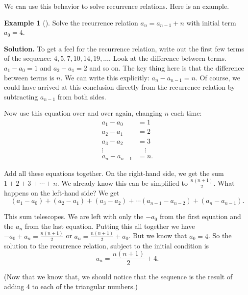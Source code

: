 \documentclass[12pt,]{book}
\theoremstyle{plain}
\theoremstyle{definition}
\theoremstyle{definition}
\newtheorem{example}[theorem]{Example}
\theoremstyle{definition}
\numberwithin{equation}{chapter}
\newcommand{\amp}{&}
\begin{document}
We can use this behavior to solve recurrence relations. Here is an example.%
\begin{example}[]\label{example-20}
\hypertarget{p-298}{}%
Solve the recurrence relation \(a_n = a_{n-1} + n\) with initial term \(a_0 = 4\).%
\par\smallskip%
\noindent\textbf{Solution.}\hypertarget{solution-34}{}\quad%
\hypertarget{p-299}{}%
To get a feel for the recurrence relation, write out the first few terms of the sequence: \(4, 5, 7, 10, 14, 19, \ldots\). Look at the difference between terms. \(a_1 - a_0 = 1\) and \(a_2 - a_1 = 2\) and so on. The key thing here is that the difference between terms is \(n\). We can write this explicitly: \(a_n - a_{n-1} = n\). Of course, we could have arrived at this conclusion directly from the recurrence relation by subtracting \(a_{n-1}\) from both sides.%
\par
\hypertarget{p-300}{}%
Now use this equation over and over again, changing \(n\) each time:%
\begin{align*}
a_1 - a_0 \amp = 1\\
a_2 - a_1 \amp = 2\\
a_3 - a_2 \amp = 3\\
\vdots \quad \amp \quad \vdots\\
a_n - a_{n-1} \amp = n.
\end{align*}
%
\par
\hypertarget{p-301}{}%
Add all these equations together. On the right-hand side, we get the sum \(1 + 2 + 3 + \cdots + n\). We already know this can be simplified to \(\frac{n(n+1)}{2}\). What happens on the left-hand side? We get%
\begin{equation*}
(a_1 - a_0) + (a_2 - a_1) + (a_3 - a_2) + \cdots (a_{n-1} - a_{n-2})+ (a_n - a_{n-1}).
\end{equation*}
%
\par
\hypertarget{p-302}{}%
This sum telescopes. We are left with only the \(-a_0\) from the first equation and the \(a_n\) from the last equation. Putting this all together we have \(-a_0 + a_n = \frac{n(n+1)}{2}\) or \(a_n = \frac{n(n+1)}{2} + a_0\). But we know that \(a_0 = 4\). So the solution to the recurrence relation, subject to the initial condition is%
\begin{equation*}
a_n = \frac{n(n+1)}{2} + 4.
\end{equation*}
%
\par
\hypertarget{p-303}{}%
(Now that we know that, we should notice that the sequence is the result of adding 4 to each of the triangular numbers.)%
\end{example}
\end{document}
